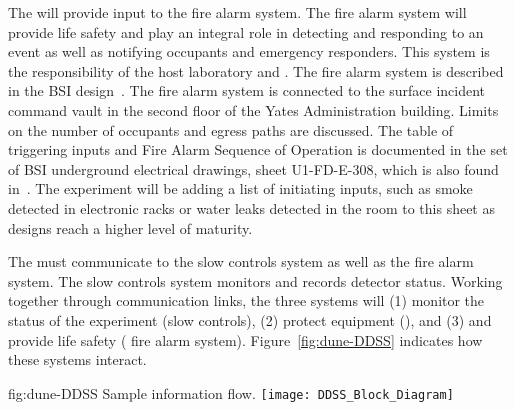 The  will provide input to the 
fire alarm system.  The  fire alarm system will provide life
safety and play an integral role in detecting and responding to an
event as well as notifying occupants and emergency responders.  This
system is the responsibility of the host laboratory and .  The
fire alarm system is described in the BSI design~\cite{bib:cernedms2093229}.  %
The  fire alarm system is connected to the surface incident command vault in the
second floor of the Yates Administration building. Limits on the
number of occupants and egress paths are discussed. The table of
triggering inputs and Fire Alarm Sequence of Operation is documented
in the set of BSI underground electrical drawings, sheet U1-FD-E-308,
which is also found in~\cite{bib:cernedms2093229}. %
The
experiment will be adding a list of initiating inputs, such as smoke
detected in electronic racks or water leaks detected in the
 room to this sheet as designs reach a higher level of
maturity.  %

 
The  must communicate to the  slow controls
system as well as the  fire alarm system.  The  slow
controls system monitors and records detector
status.  Working together through communication links, the three
systems will (1) monitor the status of the experiment (slow controls),
(2) protect equipment (),  and (3) and provide life safety ( fire alarm system). Figure~\ref{fig:dune-DDSS} indicates how these systems
interact. %
\begin{dunefigure}{fig:dune-DDSS}
  {Sample  information flow.}
  \texttt{[image: DDSS\_Block\_Diagram]}
\end{dunefigure}



